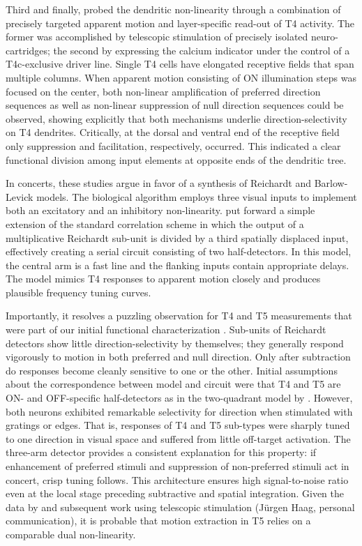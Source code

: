 Third and finally, \citet{Haag:2016cq} probed the dendritic non-linearity through a combination of precisely targeted apparent motion and layer-specific read-out of T4 activity. The former was accomplished by telescopic stimulation of precisely isolated neuro-cartridges; the second by expressing the calcium indicator under the control of a T4c-exclusive driver line. Single T4 cells have elongated receptive fields that span multiple columns. When apparent motion consisting of ON illumination steps was focused on the center, both non-linear amplification of preferred direction sequences as well as non-linear suppression of null direction sequences could be observed, showing explicitly that both mechanisms underlie direction-selectivity on T4 dendrites. Critically, at the dorsal and ventral end of the receptive field only suppression and facilitation, respectively, occurred. This indicated a clear functional division among input elements at opposite ends of the dendritic tree.

In concerts, these studies argue in favor of a synthesis of Reichardt and Barlow-Levick models. The biological algorithm employs three visual inputs to implement both an excitatory and an inhibitory non-linearity. \citet{Haag:2016cq} put forward a simple extension of the standard correlation scheme in which the output of a multiplicative Reichardt sub-unit is divided by a third spatially displaced input, effectively creating a serial circuit consisting of two half-detectors. In this model, the central arm is a fast line and the flanking inputs contain appropriate delays. The model mimics T4 responses to apparent motion closely and produces plausible frequency tuning curves.

Importantly, it resolves a puzzling observation for T4 and T5 measurements that were part of our initial functional characterization \citep{Maisak:2013kk}. Sub-units of Reichardt detectors show little direction-selectivity by themselves; they generally respond vigorously to motion in both preferred and null direction. Only after subtraction do responses become cleanly sensitive to one or the other. Initial assumptions about the correspondence between model and circuit were that T4 and T5 are ON- and OFF-specific half-detectors as in the two-quadrant model by \citet{Eichner:2011ic}. However, both neurons exhibited remarkable selectivity for direction when stimulated with gratings or edges. That is, responses of T4 and T5 sub-types were sharply tuned to one direction in visual space and suffered from little off-target activation. The three-arm detector provides a consistent explanation for this property: if enhancement of preferred stimuli and suppression of non-preferred stimuli act in concert, crisp tuning follows. This architecture ensures high signal-to-noise ratio even at the local stage preceding subtractive and spatial integration. Given the data by \citet{Leong:2016hu} and subsequent work using telescopic stimulation (Jürgen Haag, personal communication), it is probable that motion extraction in T5 relies on a comparable dual non-linearity.

